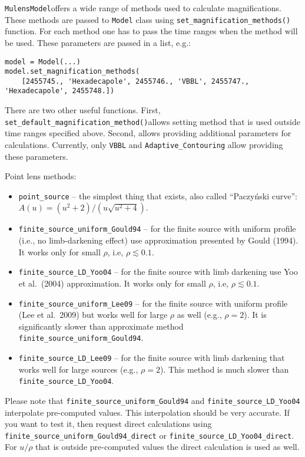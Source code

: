 \documentclass[12pt]{article}
\newcommand\MM{{\tt MulensModel}}
\begin{document}

\MM offers a wide range of methods used to calculate magnifications. 
These methods are passed to {\tt Model} class using 
{\tt set\_magnification\_methods()} function.  For each method one has to 
pass the time ranges when the method will be used.  These parameters are 
passed in a list, e.g.:

\begin{verbatim}
model = Model(...)
model.set_magnification_methods(
    [2455745., 'Hexadecapole', 2455746., 'VBBL', 2455747., 'Hexadecapole', 2455748.])
\end{verbatim}

There are two other useful functions. 
First, {\tt set\_default\_magnification\_method()}\linebreak allows setting method that 
is used outside time ranges specified above.  
Second,  allows 
providing additional parameters for calculations.  Currently, only 
{\tt VBBL} and {\tt Adaptive\_Contouring} allow providing these parameters. 

\bigskip\bigskip
Point lens methods:
\begin{itemize}
\item {\tt point\_source} -- the simplest thing that exists, also called ``Paczy\'nski curve'':\linebreak $A(u) = \left(u^2+2\right)/\left(u\sqrt{u^2+4}\right)$.
\item {\tt finite\_source\_uniform\_Gould94} -- for the finite source with uniform profile (i.e., no limb-darkening effect) use approximation presented by Gould (1994).  It works only for small $\rho$, i.e, $\rho\lesssim0.1$.
\item {\tt finite\_source\_LD\_Yoo04} -- for the finite source with limb darkening use Yoo et al.~(2004) approximation.  It works only for small $\rho$, i.e, $\rho\lesssim0.1$.
\item {\tt finite\_source\_uniform\_Lee09} -- for the finite source with uniform profile (Lee et al.~2009) but works well for large $\rho$ as well (e.g., $\rho = 2$).  It is significantly slower than approximate method {\tt finite\_source\_uniform\_Gould94}.
\item {\tt finite\_source\_LD\_Lee09} -- for the finite source with limb darkening that works well for large sources (e.g., $\rho = 2$).  This method is much slower than {\tt finite\_source\_LD\_Yoo04}.
\end{itemize}
Please note that {\tt finite\_source\_uniform\_Gould94} and {\tt finite\_source\_LD\_Yoo04} interpolate pre-com\-pu\-ted values.  This interpolation should be very accurate.
If you want to test it, then request direct calculations using {\tt finite\_source\_uniform\_Gould94\_direct} or {\tt finite\_source\_LD\_Yoo04\_direct}.
For $u/\rho$ that is outside pre-computed values the direct calculation is used as well.
\end{document}
